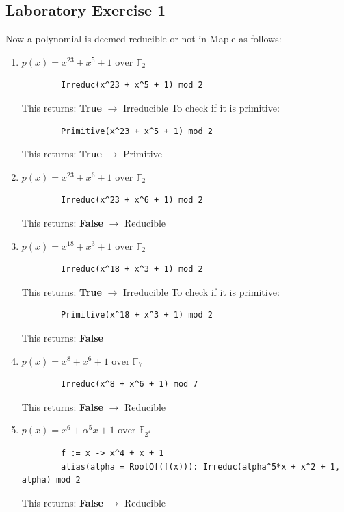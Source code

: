 \documentclass{article}
\begin{document}
\subsection{Laboratory Exercise 1}
Now a polynomial is deemed reducible or not in Maple as follows:
\begin{enumerate}
    \item $p(x) = x^{23} + x^5 + 1 \text{ over } \mathbb F_2$ \\
    \begin{verbatim}
        Irreduc(x^23 + x^5 + 1) mod 2
    \end{verbatim}
    This returns: \textbf{True} $\rightarrow$ Irreducible
    To check if it is primitive:
    \begin{verbatim}
        Primitive(x^23 + x^5 + 1) mod 2
    \end{verbatim}
    This returns: \textbf{True} $\rightarrow$ Primitive
    \item $p(x) = x^{23} + x^6 + 1 \text{ over } \mathbb F_2$ \\
        \begin{verbatim}
        Irreduc(x^23 + x^6 + 1) mod 2
    \end{verbatim}
    This returns: \textbf{False} $\rightarrow$ Reducible
    \item $p(x) = x^{18} + x^3 + 1 \text{ over } \mathbb F_2$ \\
        \begin{verbatim}
        Irreduc(x^18 + x^3 + 1) mod 2
    \end{verbatim}
    This returns: \textbf{True} $\rightarrow$ Irreducible
    To check if it is primitive:
    \begin{verbatim}
        Primitive(x^18 + x^3 + 1) mod 2
    \end{verbatim}
    This returns: \textbf{False}
    \item $p(x) = x^8 + x^6 + 1 \text{ over } \mathbb F_7$ \\
        \begin{verbatim}
        Irreduc(x^8 + x^6 + 1) mod 7
    \end{verbatim}
    This returns: \textbf{False} $\rightarrow$ Reducible
    \item $p(x) = x^6 + \alpha^5 x + 1 \text{ over } \mathbb F_{2^4}$ \\
        \begin{verbatim}
        f := x -> x^4 + x + 1
        alias(alpha = RootOf(f(x))): Irreduc(alpha^5*x + x^2 + 1, alpha) mod 2
    \end{verbatim}
    This returns: \textbf{False} $\rightarrow$ Reducible
\end{enumerate}
\end{document}
